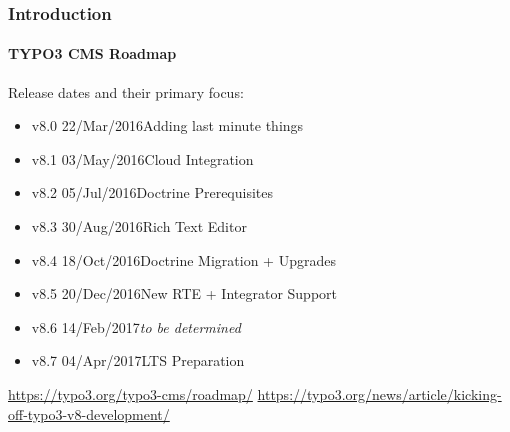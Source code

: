 \begin{frame}[fragile]
	\frametitle{Introduction}
	\framesubtitle{TYPO3 CMS Roadmap}

	Release dates and their primary focus:

	\begin{itemize}

		\item v8.0 \tabto{1.1cm}22/Mar/2016\tabto{3.4cm}Adding last minute things
		\item v8.1 \tabto{1.1cm}03/May/2016\tabto{3.4cm}Cloud Integration
		\item v8.2 \tabto{1.1cm}05/Jul/2016\tabto{3.4cm}Doctrine Prerequisites
		\item v8.3 \tabto{1.1cm}30/Aug/2016\tabto{3.4cm}Rich Text Editor
		\item v8.4 \tabto{1.1cm}18/Oct/2016\tabto{3.4cm}Doctrine Migration + Upgrades
		\item
			\begingroup
				\color{typo3orange}
					v8.5 \tabto{1.1cm}20/Dec/2016\tabto{3.4cm}New RTE + Integrator Support
			\endgroup
		\item v8.6 \tabto{1.1cm}14/Feb/2017\tabto{3.4cm}\textit{to be determined}
		\item v8.7 \tabto{1.1cm}04/Apr/2017\tabto{3.4cm}LTS Preparation

	\end{itemize}

	\smaller
		\url{https://typo3.org/typo3-cms/roadmap/}\newline
		\url{https://typo3.org/news/article/kicking-off-typo3-v8-development/}
	\normalsize

\end{frame}

